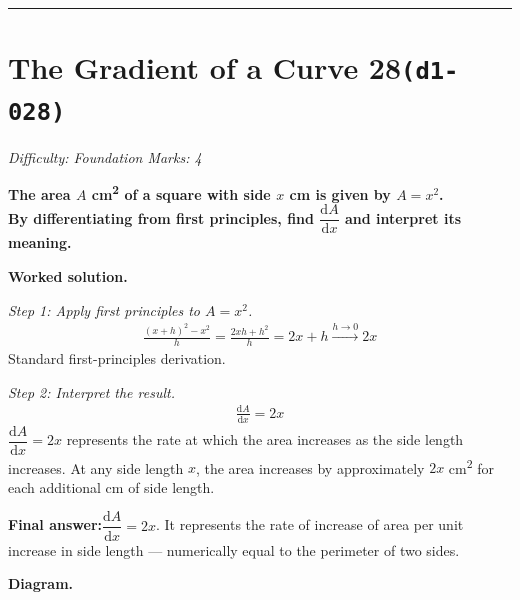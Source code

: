\documentclass[11pt]{article}
\newcommand{\question}[1]{\par\medskip\noindent\textbf{#1}\par}
\begin{document}
\medskip\hrule

\section*{The Gradient of a Curve 28\quad\small\texttt{(d1-028)}}
\textit{Difficulty: Foundation \quad\textbar\quad Marks: 4}

\question{The area \( A \) cm\textsuperscript{2} of a square with side \( x \) cm is given by \( A = x^2 \).\\[3pt]  By differentiating from first principles, find \( \dfrac{\mathrm{d}A}{\mathrm{d}x} \) and interpret its meaning.}

\textbf{Worked solution.}

\textit{Step 1: Apply first principles to \( A = x^2 \).}
\[\begin{gathered}
\frac{(x+h)^2 - x^2}{h} = \frac{2xh + h^2}{h} = 2x + h \xrightarrow{h \to 0} 2x
\end{gathered}\]
Standard first-principles derivation.

\textit{Step 2: Interpret the result.}
\[\begin{gathered}
\frac{\mathrm{d}A}{\mathrm{d}x} = 2x
\end{gathered}\]
\( \dfrac{\mathrm{d}A}{\mathrm{d}x} = 2x \) represents the rate at which the area increases as the side length increases. At any side length \( x \), the area increases by approximately \( 2x \) cm\textsuperscript{2} for each additional cm of side length.

\begin{answerbox}
\textbf{Final answer:}\quad \(\displaystyle  \dfrac{\mathrm{d}A}{\mathrm{d}x} = 2x \). It represents the rate of increase of area per unit increase in side length --- numerically equal to the perimeter of two sides.
\end{answerbox}
\textbf{Diagram.}
\end{document}

